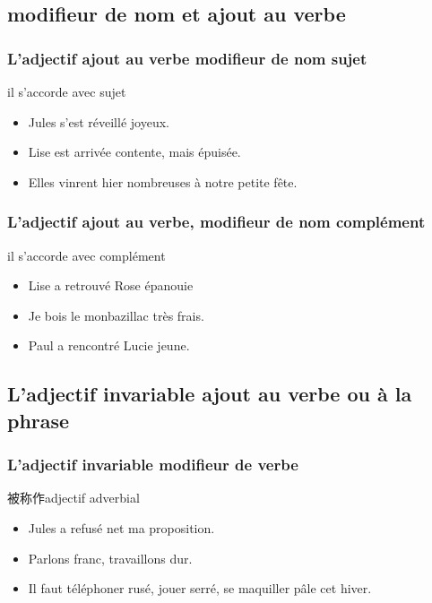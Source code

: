 \documentclass[UTF8]{report}
\begin{document}
\subsection{modifieur de nom et ajout au verbe}

\subsubsection{L’adjectif ajout au verbe modifieur de nom sujet}
il s’accorde avec sujet
\begin{itemize}
    \item Jules s’est réveillé joyeux.
    \item Lise est arrivée contente, mais épuisée.
    \item Elles vinrent hier nombreuses à notre petite fête.
\end{itemize}


\subsubsection{L’adjectif ajout au verbe, modifieur de nom complément}
il s’accorde avec complément 
\begin{itemize}
    \item Lise a retrouvé Rose épanouie
    \item Je bois le monbazillac très frais.
    \item Paul a rencontré Lucie jeune.
\end{itemize}

\subsection{L’adjectif invariable ajout au verbe ou à la phrase}
\subsubsection{L’adjectif invariable modifieur de verbe}
被称作adjectif adverbial
\begin{itemize}
    \item Jules a refusé net ma proposition.
    \item Parlons franc, travaillons dur.
    \item Il faut téléphoner rusé, jouer serré, se maquiller pâle cet hiver.
\end{itemize}
\end{document}
